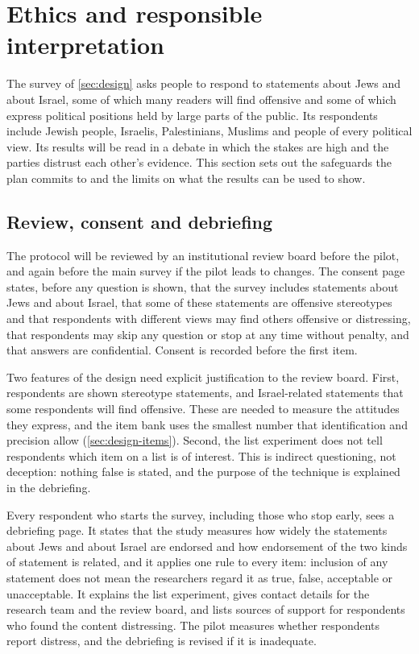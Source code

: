 \section{Ethics and responsible interpretation}\label{sec:ethics}

The survey of \cref{sec:design} asks people to respond to statements about Jews and about Israel, some of which many readers will find offensive and some of which express political positions held by large parts of the public. Its respondents include Jewish people, Israelis, Palestinians, Muslims and people of every political view. Its results will be read in a debate in which the stakes are high and the parties distrust each other's evidence. This section sets out the safeguards the plan commits to and the limits on what the results can be used to show.

\subsection{Review, consent and debriefing}\label{sec:ethics-consent}

The protocol will be reviewed by an institutional review board before the pilot, and again before the main survey if the pilot leads to changes. The consent page states, before any question is shown, that the survey includes statements about Jews and about Israel, that some of these statements are offensive stereotypes and that respondents with different views may find others offensive or distressing, that respondents may skip any question or stop at any time without penalty, and that answers are confidential. Consent is recorded before the first item.

Two features of the design need explicit justification to the review board. First, respondents are shown stereotype statements, and Israel-related statements that some respondents will find offensive. These are needed to measure the attitudes they express, and the item bank uses the smallest number that identification and precision allow (\cref{sec:design-items}). Second, the list experiment does not tell respondents which item on a list is of interest. This is indirect questioning, not deception: nothing false is stated, and the purpose of the technique is explained in the debriefing.

Every respondent who starts the survey, including those who stop early, sees a debriefing page. It states that the study measures how widely the statements about Jews and about Israel are endorsed and how endorsement of the two kinds of statement is related, and it applies one rule to every item: inclusion of any statement does not mean the researchers regard it as true, false, acceptable or unacceptable. It explains the list experiment, gives contact details for the research team and the review board, and lists sources of support for respondents who found the content distressing. The pilot measures whether respondents report distress, and the debriefing is revised if it is inadequate.

